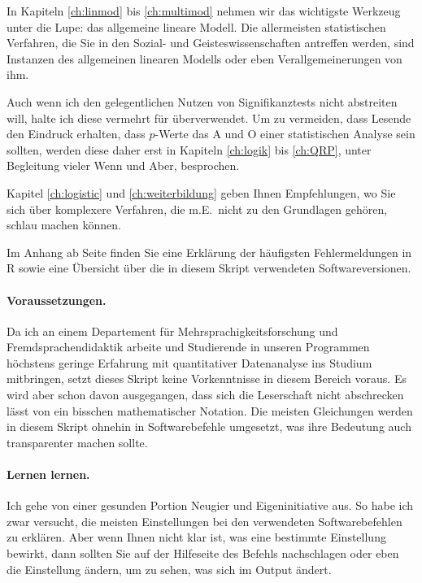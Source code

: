 \documentclass[oneside, 10pt]{book}\usepackage[]{graphicx}\usepackage[]{xcolor}
\begin{document}
In Kapiteln \ref{ch:linmod} bis \ref{ch:multimod}
nehmen wir das wichtigste Werkzeug unter die Lupe: das allgemeine
lineare Modell. Die allermeisten statistischen Verfahren, die
Sie in den Sozial- und Geisteswissenschaften antreffen werden,
sind Instanzen des allgemeinen linearen Modells oder eben
Verallgemeinerungen von ihm.

Auch wenn ich den gelegentlichen Nutzen von Signifikanztests
nicht abstreiten will, halte ich diese vermehrt für überverwendet.
Um zu vermeiden, dass Lesende den Eindruck erhalten, dass $p$-Werte
das A und O einer statistischen Analyse sein sollten, werden
diese daher erst in Kapiteln \ref{ch:logik} bis \ref{ch:QRP}, 
unter Begleitung vieler Wenn
und Aber, besprochen.

Kapitel \ref{ch:logistic} und \ref{ch:weiterbildung} geben Ihnen Empfehlungen,
wo Sie sich über komplexere Verfahren, die m.E.\ nicht zu den Grundlagen
gehören, schlau machen können.

Im Anhang ab Seite \pageref{ch:fehlermeldungen} finden Sie eine Erklärung der
häufigsten Fehlermeldungen in R sowie eine Übersicht über die 
in diesem Skript verwendeten Softwareversionen.

\paragraph{Voraussetzungen.}
Da ich an einem Departement für Mehrsprachigkeitsforschung
und Fremdsprachendidaktik arbeite und Studierende in unseren Programmen
höchstens geringe Erfahrung mit quantitativer Datenanalyse ins Studium
mitbringen,
setzt dieses Skript keine Vorkenntnisse in diesem Bereich voraus.
Es wird aber schon davon ausgegangen, dass sich die Leserschaft nicht
abschrecken lässt von ein bisschen mathematischer Notation. Die meisten
Gleichungen werden in diesem Skript ohnehin in Softwarebefehle umgesetzt,
was ihre Bedeutung auch transparenter machen sollte.

\paragraph{Lernen lernen.}
Ich gehe von einer gesunden Portion Neugier und Eigeninitiative aus.
So habe ich zwar versucht, die meisten Einstellungen bei den verwendeten
Softwarebefehlen zu erklären. Aber wenn Ihnen nicht klar ist, was eine bestimmte
Einstellung bewirkt, dann sollten Sie auf der Hilfeseite des Befehls
nachschlagen oder eben die Einstellung ändern, um zu sehen, was sich
im Output ändert.
\end{document}
